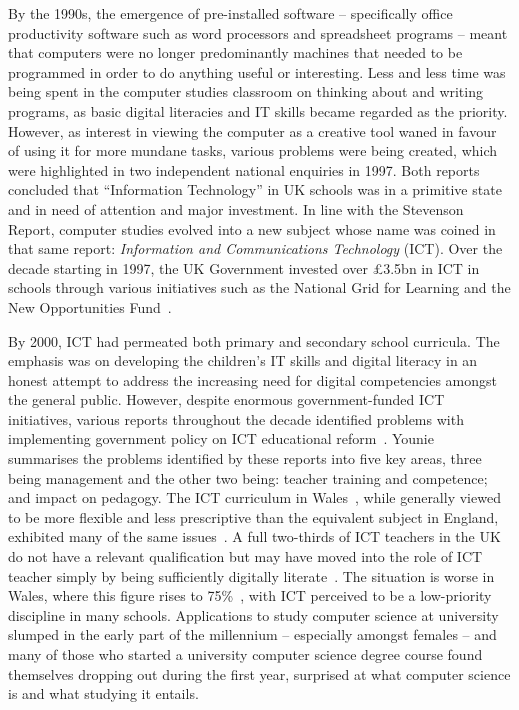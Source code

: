 \documentclass{llncs}
\begin{document}
By the 1990s, the emergence of pre-installed software -- specifically
office productivity software such as word processors and spreadsheet
programs -- meant that computers were no longer predominantly machines
that needed to be programmed in order to do anything useful or
interesting.  Less and less time was being spent in the computer
studies classroom on thinking about and writing programs, as basic
digital literacies and IT skills became regarded as the
priority. However, as interest in viewing the computer as a creative
tool waned in favour of using it for more mundane tasks, various
problems were being created, which were highlighted in two independent
national enquiries in 1997.  Both reports
concluded that ``Information Technology'' in UK schools was in a primitive
state and in need of attention and major investment. In line with the
Stevenson Report, computer studies evolved into a new subject whose
name was coined in that same report: {\emph{Information and
Communications Technology}} (ICT).  Over the decade starting in 1997,
the UK Government invested over \pounds3.5bn in ICT in schools through
various initiatives such as the National Grid for Learning and the New
Opportunities Fund~\cite{Doughty:2006}.


By 2000, ICT had permeated both primary and secondary school
curricula. The emphasis was on developing the children's IT skills and
digital literacy in an honest attempt to address the increasing need
for digital competencies amongst the general public.  However, despite
enormous government-funded ICT initiatives, various reports throughout
the decade identified problems with implementing government policy on
ICT educational
reform~\cite{OpieFukuyo:2000,Ofsted:2001,Ofsted:2002,Ofsted:2004,Loveless:2005}.
Younie~\cite{Younie:2006} summarises the problems identified by these
reports into five key areas, three being management and the other two
being: teacher training and competence; and impact on pedagogy. The
ICT curriculum in Wales~\cite{welshictcurric:2008}, while generally
viewed to be more flexible and less prescriptive than the equivalent
subject in England, exhibited many of the same
issues~\cite{estynict:2013,estynict:2014}.  A full
two-thirds of ICT teachers in the UK do not have a relevant
qualification but may have moved into the role of ICT teacher simply
by being sufficiently digitally literate~\cite{RoyalSoc:2012}.  The
situation is worse in Wales, where this figure rises to
75\%~\cite{GTCW:2008}, with ICT perceived to be a low-priority
discipline in many schools. Applications to study computer science at
university slumped in the early part of the millennium -- especially
amongst females -- and many of those who started a university computer
science degree course found themselves dropping out during the first
year, surprised at what computer science is and what studying it
entails.
\end{document}
